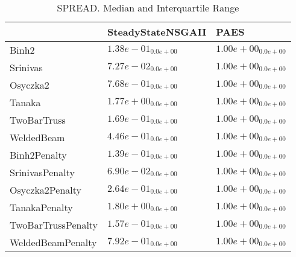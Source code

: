 \documentclass{article}
\begin{document}
\begin{table}
\caption{SPREAD. Median and Interquartile Range}
\label{table: SPREAD}
\centering
\begin{scriptsize}
\begin{tabular}{lll}
\hline & SteadyStateNSGAII &  PAES\\
\hline 
Binh2 & \cellcolor{gray95}$  1.38e-01_{ 0.0e+00}$ & \cellcolor{gray25}$  1.00e+00_{ 0.0e+00}$ \\
Srinivas & \cellcolor{gray95}$  7.27e-02_{ 0.0e+00}$ & \cellcolor{gray25}$  1.00e+00_{ 0.0e+00}$ \\
Osyczka2 & \cellcolor{gray95}$  7.68e-01_{ 0.0e+00}$ & \cellcolor{gray25}$  1.00e+00_{ 0.0e+00}$ \\
Tanaka & \cellcolor{gray25}$  1.77e+00_{ 0.0e+00}$ & \cellcolor{gray95}$  1.00e+00_{ 0.0e+00}$ \\
TwoBarTruss & \cellcolor{gray95}$  1.69e-01_{ 0.0e+00}$ & \cellcolor{gray25}$  1.00e+00_{ 0.0e+00}$ \\
WeldedBeam & \cellcolor{gray95}$  4.46e-01_{ 0.0e+00}$ & \cellcolor{gray25}$  1.00e+00_{ 0.0e+00}$ \\
Binh2Penalty & \cellcolor{gray95}$  1.39e-01_{ 0.0e+00}$ & \cellcolor{gray25}$  1.00e+00_{ 0.0e+00}$ \\
SrinivasPenalty & \cellcolor{gray95}$  6.90e-02_{ 0.0e+00}$ & \cellcolor{gray25}$  1.00e+00_{ 0.0e+00}$ \\
Osyczka2Penalty & \cellcolor{gray95}$  2.64e-01_{ 0.0e+00}$ & \cellcolor{gray25}$  1.00e+00_{ 0.0e+00}$ \\
TanakaPenalty & \cellcolor{gray25}$  1.80e+00_{ 0.0e+00}$ & \cellcolor{gray95}$  1.00e+00_{ 0.0e+00}$ \\
TwoBarTrussPenalty & \cellcolor{gray95}$  1.57e-01_{ 0.0e+00}$ & \cellcolor{gray25}$  1.00e+00_{ 0.0e+00}$ \\
WeldedBeamPenalty & \cellcolor{gray95}$  7.92e-01_{ 0.0e+00}$ & \cellcolor{gray25}$  1.00e+00_{ 0.0e+00}$ \\
\hline
\end{tabular}
\end{scriptsize}
\end{table}
\end{document}
